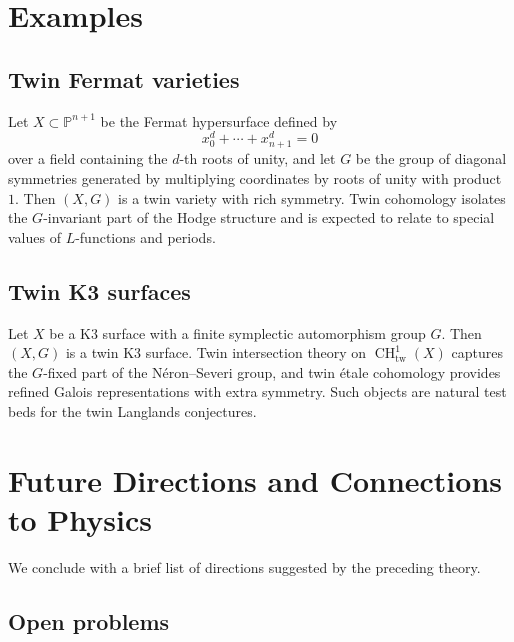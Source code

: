\documentclass[11pt,a4paper]{article}
\numberwithin{equation}{section}
\DeclareMathOperator{\CH}{CH}
\begin{document}
	\section{Examples}
	\label{sec:examples}
	
	\subsection{Twin Fermat varieties}
	
	\begin{example}
		Let $X\subset\mathbb{P}^{n+1}$ be the Fermat hypersurface defined by
		\[
		x_0^{d}+\cdots+x_{n+1}^{d}=0
		\]
		over a field containing the $d$-th roots of unity, and let $G$ be the group of diagonal symmetries
		generated by multiplying coordinates by roots of unity with product $1$.
		Then $(X,G)$ is a twin variety with rich symmetry.
		Twin cohomology isolates the $G$-invariant part of the Hodge structure and is expected to relate
		to special values of $L$-functions and periods.
	\end{example}
	
	\subsection{Twin K3 surfaces}
	
	\begin{example}[Twin K3]
		Let $X$ be a K3 surface with a finite symplectic automorphism group $G$.
		Then $(X,G)$ is a twin K3 surface.
		Twin intersection theory on $\CH^1_{\mathrm{tw}}(X)$ captures the $G$-fixed part of the N\'eron--Severi group,
		and twin \'etale cohomology provides refined Galois representations with extra symmetry.
		Such objects are natural test beds for the twin Langlands conjectures.
	\end{example}
	
	\section{Future Directions and Connections to Physics}
	\label{sec:future}
	
	We conclude with a brief list of directions suggested by the preceding theory.
	
	\subsection{Open problems}
	
\end{document}
